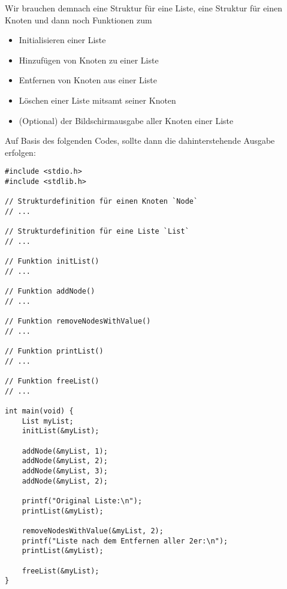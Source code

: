 \begin{figure}[htb!]
\end{figure}

Wir brauchen demnach eine Struktur für eine Liste, eine Struktur für einen
Knoten und dann noch Funktionen zum
\begin{itemize}
    \item Initialisieren einer Liste
    \item Hinzufügen von Knoten zu einer Liste
    \item Entfernen von Knoten aus einer Liste
    \item Löschen einer Liste mitsamt seiner Knoten
    \item (Optional) der Bildschirmausgabe aller Knoten einer Liste
\end{itemize}

Auf Basis des folgenden Codes, sollte dann die dahinterstehende Ausgabe
erfolgen:

\begin{verbatim}
#include <stdio.h>
#include <stdlib.h>

// Strukturdefinition für einen Knoten `Node`
// ...

// Strukturdefinition für eine Liste `List`
// ...

// Funktion initList()
// ...

// Funktion addNode()
// ...

// Funktion removeNodesWithValue()
// ...

// Funktion printList()
// ...

// Funktion freeList()
// ...

int main(void) {
    List myList;
    initList(&myList);

    addNode(&myList, 1);
    addNode(&myList, 2);
    addNode(&myList, 3);
    addNode(&myList, 2);

    printf("Original Liste:\n");
    printList(&myList);

    removeNodesWithValue(&myList, 2);
    printf("Liste nach dem Entfernen aller 2er:\n");
    printList(&myList);

    freeList(&myList);
}
\end{verbatim}


